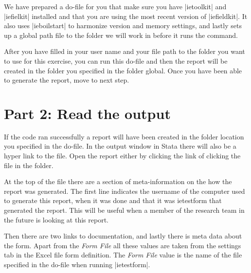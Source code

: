 \documentclass{tufte-handout}
\begin{document}
	We have prepared a do-file for you that make sure you have |ietoolkit| and |iefielkit| installed and that you are using the most recent version of |iefieldkit|. It also uses |ieboilstart| to harmonize version and memory settings, and lastly sets up a global path file to the folder we will work in before it runs the command.
	
	After you have filled in your user name and your file path to the folder you want to use for this exercise, you can run this do-file and then the report will be created in the folder you specified in the folder global. Once you have been able to generate the report, move to next step.


	\begin{minipage}{1.5\textwidth}
	\vspace{.5cm}
 	\end{minipage}


\section{Part 2: Read the output}

	If the code ran successfully a report will have been created in the folder location you specified in the do-file. In the output window in Stata there will also be a hyper link to the file. Open the report either by clicking the link of clicking the file in the folder. 
	
	At the top of the file there are a section of meta-information on the how the report was generated. The first line indicates the username of the computer used to generate this report, when it was done and that it was ietestform that generated the report. This will be useful when a member of the research team in the future is looking at this report.
	
	Then there are two links to documentation, and lastly there is meta data about the form. Apart from the \textit{Form File} all these values are taken from the settings tab in the Excel file form definition. The \textit{Form File} value is the name of the file specified in the do-file when running |ietestform|.
\end{document}
